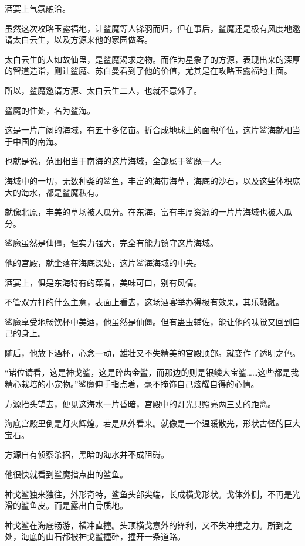 
\begin{this_body}

酒宴上气氛融洽。

虽然这次攻略玉露福地，让鲨魔等人铩羽而归，但在事后，鲨魔还是极有风度地邀请太白云生，以及方源来他的家园做客。

太白云生的人如故仙蛊，是鲨魔渴求之物。而作为星象子的方源，表现出来的深厚的智道造诣，则让鲨魔、苏白曼看到了他的价值，尤其是在攻略玉露福地上面。

所以，鲨魔邀请方源、太白云生二人，也就不意外了。

鲨魔的住处，名为鲨海。

这是一片广阔的海域，有五十多亿亩。折合成地球上的面积单位，这片鲨海就相当于中国的南海。

也就是说，范围相当于南海的这片海域，全部属于鲨魔一人。

海域中的一切，无数种类的鲨鱼，丰富的海带海草，海底的沙石，以及这些体积庞大的海水，都是鲨魔私有。

就像北原，丰美的草场被人瓜分。在东海，富有丰厚资源的一片片海域也被人瓜分。

鲨魔虽然是仙僵，但实力强大，完全有能力镇守这片海域。

他的宫殿，就坐落在海底深处，这片鲨海海域的中央。

酒宴上，俱是东海特有的菜肴，美味可口，别有风情。

不管双方打的什么主意，表面上看去，这场酒宴举办得极有效果，其乐融融。

鲨魔享受地畅饮杯中美酒，他虽然是仙僵。但有蛊虫辅佐，能让他的味觉又回到自己的身上。

随后，他放下酒杯，心念一动，雄壮又不失精美的宫殿顶部。就变作了透明之色。

“诸位请看，这是神戈鲨，这是碎齿金鲨，而那边的则是银鳞大宝鲨……这些都是我精心栽培的小宠物。”鲨魔伸手指点着，毫不掩饰自己炫耀自得的心情。

方源抬头望去，便见这海水一片昏暗，宫殿中的灯光只照亮两三丈的距离。

海底宫殿里倒是灯火辉煌。若是从外看来。就像是一个温暖散光，形状古怪的巨大宝石。

方源自有侦察杀招，黑暗的海水并不成阻碍。

他很快就看到鲨魔指点出的鲨鱼。

神戈鲨独来独往，外形奇特，鲨鱼头部尖端，长成横戈形状。戈体外侧，不再是光滑的鲨鱼皮。而是露出白骨质地。

神戈鲨在海底畅游，横冲直撞。头顶横戈意外的锋利，又不失冲撞之力。所到之处，海底的山石都被神戈鲨撞碎，撞开一条道路。


\end{this_body}
